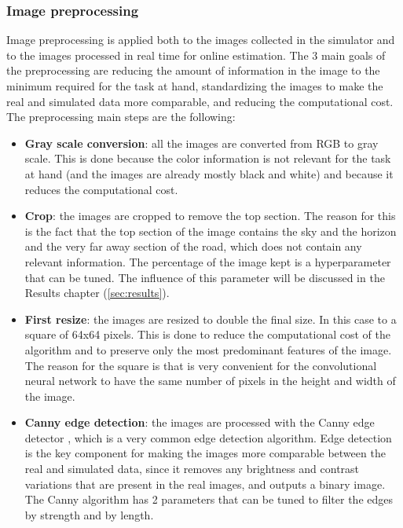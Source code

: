 \documentclass[a4paper,12pt,sort&compress]{article}
\begin{document}
    \subsubsection*{Image preprocessing}
    Image preprocessing is applied both to the images collected in the simulator and to the images
    processed in real time for online estimation. The 3 main goals of the preprocessing are reducing the 
    amount of information in the image to the minimum required for the task at hand, standardizing
    the images to make the real and simulated data more comparable, and reducing the computational 
    cost. The preprocessing main steps are the following:
    \begin{itemize}
        \item \textbf{Gray scale conversion}: all the images are converted from RGB to gray scale.
        This is done because the color information is not relevant for the task at hand (and the
        images are already mostly black and white) and because it reduces the computational cost.
        \item \textbf{Crop}: the images are cropped to remove the top section. The reason for this
        is the fact that the top section of the image contains the sky and the horizon and the very
        far away section of the road, which does not contain any relevant information. The
        percentage of the image kept is a hyperparameter that can be tuned. The influence of this
        parameter will be discussed in the Results chapter (\ref{sec:results}).
        \item \textbf{First resize}: the images are resized to double the final size. In this case
        to a square of 64x64 pixels. This is done to reduce the computational cost of the algorithm
        and to preserve only the most predominant features of the image. The reason for the square
        is that is very convenient for the convolutional neural network to have the same number of 
        pixels in the height and width of the image.
        \item \textbf{Canny edge detection}: the images are processed with the Canny edge detector
        \citep*{canny}, which is a very common edge detection algorithm. Edge detection is the key
        component for making the images more comparable between the real and simulated data, since
        it removes any brightness and contrast variations that are present in the real images, and
        outputs a binary image. The Canny algorithm has 2 parameters that can be tuned to filter the
        edges by strength and by length.   

\end{itemize}
\end{document}
